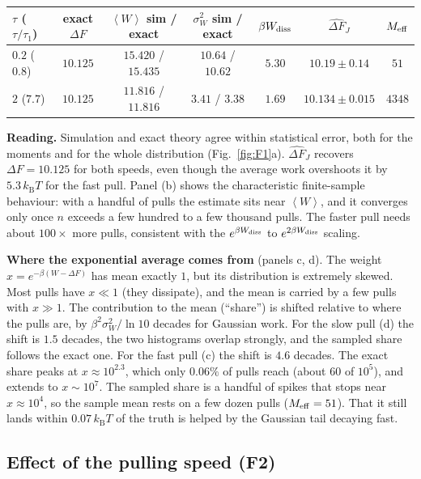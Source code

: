 \documentclass[11pt,a4paper]{article}
\newcommand{\kT}{k_{\mathrm B}T}
\newcommand{\avg}[1]{\left\langle #1\right\rangle}
\newcommand{\Wd}{W_{\rm diss}}
\newcommand{\dFJ}{\widehat{\Delta F}_J}
\begin{document}
\begin{center}\small
\begin{tabular}{lcccccc}
\toprule
$\tau$ ($\tau/\tau_1$) & exact $\Delta F$ & $\avg W$ sim / exact & $\sigma_W^2$ sim / exact & $\beta\Wd$ & $\dFJ$ & $M_{\rm eff}$\\
\midrule
$0.2$ ($0.8$) & $10.125$ & $15.420$ / $15.435$ & $10.64$ / $10.62$ & $5.30$ & $10.19\pm0.14$ & $51$\\
$2$ ($7.7$) & $10.125$ & $11.816$ / $11.816$ & $3.41$ / $3.38$ & $1.69$ & $10.134\pm0.015$ & $4348$\\
\bottomrule
\end{tabular}
\end{center}

\noindent\textbf{Reading.} Simulation and exact theory agree within statistical error, both for
the moments and for the whole distribution (Fig.~\ref{fig:F1}a). $\dFJ$ recovers
$\Delta F=10.125$ for both speeds, even though the average work overshoots it by
$5.3\,\kT$ for the fast pull. Panel (b) shows the characteristic finite-sample behaviour: with a
handful of pulls the estimate sits near $\avg W$, and it converges only once $n$ exceeds a
few hundred to a few thousand pulls. The faster pull needs about $100\times$ more pulls,
consistent with the $e^{\beta\Wd}$ to $e^{2\beta\Wd}$ scaling.

\noindent\textbf{Where the exponential average comes from} (panels c, d). The weight
$x=e^{-\beta(W-\Delta F)}$ has mean exactly $1$, but its distribution is extremely skewed. Most pulls
have $x\ll1$ (they dissipate), and the mean is carried by a few pulls with $x\gg1$. The contribution
to the mean (``share'') is shifted relative to where the pulls are, by $\beta^2\sigma_W^2/\ln 10$
decades for Gaussian work. For the slow pull (d) the shift is $1.5$ decades, the two
histograms overlap strongly, and the sampled share follows the exact one. For the fast pull (c) the
shift is $4.6$ decades. The exact share peaks at $x\approx10^{2.3}$, which only $0.06\%$ of pulls reach (about $60$ of $10^5$), and
extends to $x\sim10^{7}$. The sampled share is a handful of spikes that stops near $x\approx10^{4}$, so
the sample mean rests on a few dozen pulls ($M_{\rm eff}=51$). That it still lands within
$0.07\,\kT$ of the truth is helped by the Gaussian tail decaying fast.

\subsection{Effect of the pulling speed (F2)}
\end{document}
